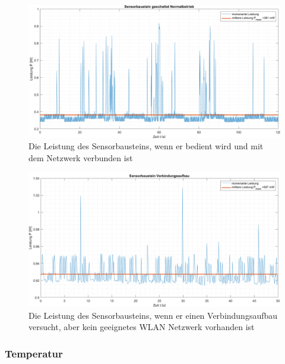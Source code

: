 \begin{figure}[H]
	\centering
	\includegraphics[width=1\textwidth]{graphics/Sensorbaustein_geschaltet.png}
	\caption{Die Leistung des Sensorbausteins, wenn er bedient wird und mit dem Netzwerk verbunden ist}
	\label{pic: Sensorbaustein_geschaltet}
\end{figure}

\begin{figure}[H]
	\centering
	\includegraphics[width=1\textwidth]{graphics/Sensorbaustein_Verbindungsaufbau.png}
	\caption{Die Leistung des Sensorbausteins, wenn er einen Verbindungsaufbau versucht, aber kein geeignetes WLAN Netzwerk vorhanden ist}
	\label{pic: Sensorbaustein_verbindungsaufbau}
\end{figure}




\subsubsection{Temperatur}





